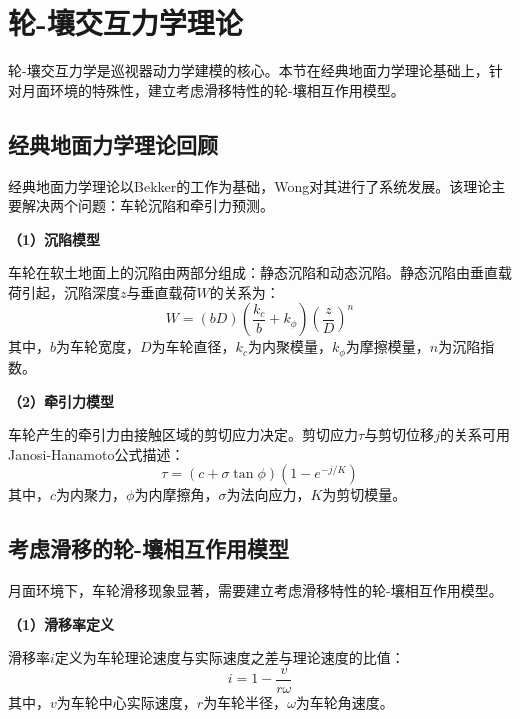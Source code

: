 \section{轮-壤交互力学理论}
\label{sec:wheel_soil}

轮-壤交互力学是巡视器动力学建模的核心。本节在经典地面力学理论基础上，针对月面环境的特殊性，建立考虑滑移特性的轮-壤相互作用模型。

\subsection{经典地面力学理论回顾}
\label{subsec:classical_terra}

经典地面力学理论以Bekker\cite{ref11}的工作为基础，Wong\cite{ref18}对其进行了系统发展。该理论主要解决两个问题：车轮沉陷和牵引力预测。

\textbf{（1）沉陷模型}

车轮在软土地面上的沉陷由两部分组成：静态沉陷和动态沉陷。静态沉陷由垂直载荷引起，沉陷深度$z$与垂直载荷$W$的关系为：
\begin{equation}
    W = (bD)\left(\frac{k_c}{b} + k_\phi\right)\left(\frac{z}{D}\right)^n
    \label{eq:sinkage}
\end{equation}
其中，$b$为车轮宽度，$D$为车轮直径，$k_c$为内聚模量，$k_\phi$为摩擦模量，$n$为沉陷指数。

\textbf{（2）牵引力模型}

车轮产生的牵引力由接触区域的剪切应力决定。剪切应力$\tau$与剪切位移$j$的关系可用Janosi-Hanamoto公式描述：
\begin{equation}
    \tau = (c + \sigma\tan\phi)\left(1 - e^{-j/K}\right)
    \label{eq:shear}
\end{equation}
其中，$c$为内聚力，$\phi$为内摩擦角，$\sigma$为法向应力，$K$为剪切模量。

\subsection{考虑滑移的轮-壤相互作用模型}
\label{subsec:slip_model}

月面环境下，车轮滑移现象显著，需要建立考虑滑移特性的轮-壤相互作用模型。

\textbf{（1）滑移率定义}

滑移率$i$定义为车轮理论速度与实际速度之差与理论速度的比值：
\begin{equation}
    i = 1 - \frac{v}{r\omega}
    \label{eq:slip_ratio}
\end{equation}
其中，$v$为车轮中心实际速度，$r$为车轮半径，$\omega$为车轮角速度。


